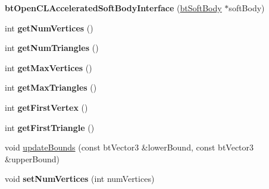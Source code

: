 \begin{DoxyCompactItemize}
\item 
\hypertarget{classbt_open_c_l_accelerated_soft_body_interface_a0a1876d09fadf797d65cb9917ca86e87}{{\bfseries bt\+Open\+C\+L\+Accelerated\+Soft\+Body\+Interface} (\hyperlink{classbt_soft_body}{bt\+Soft\+Body} $\ast$soft\+Body)}\label{classbt_open_c_l_accelerated_soft_body_interface_a0a1876d09fadf797d65cb9917ca86e87}

\item 
\hypertarget{classbt_open_c_l_accelerated_soft_body_interface_a969a40bb22b69af274843499bf48416c}{int {\bfseries get\+Num\+Vertices} ()}\label{classbt_open_c_l_accelerated_soft_body_interface_a969a40bb22b69af274843499bf48416c}

\item 
\hypertarget{classbt_open_c_l_accelerated_soft_body_interface_a577f0e851770e756515294ca475bcef3}{int {\bfseries get\+Num\+Triangles} ()}\label{classbt_open_c_l_accelerated_soft_body_interface_a577f0e851770e756515294ca475bcef3}

\item 
\hypertarget{classbt_open_c_l_accelerated_soft_body_interface_a4c3cf743e4af762e1e985da0aab05412}{int {\bfseries get\+Max\+Vertices} ()}\label{classbt_open_c_l_accelerated_soft_body_interface_a4c3cf743e4af762e1e985da0aab05412}

\item 
\hypertarget{classbt_open_c_l_accelerated_soft_body_interface_a500adc07a0d67e6574d30bce3e12e240}{int {\bfseries get\+Max\+Triangles} ()}\label{classbt_open_c_l_accelerated_soft_body_interface_a500adc07a0d67e6574d30bce3e12e240}

\item 
\hypertarget{classbt_open_c_l_accelerated_soft_body_interface_a40343ab4b8206db1f23881944326a831}{int {\bfseries get\+First\+Vertex} ()}\label{classbt_open_c_l_accelerated_soft_body_interface_a40343ab4b8206db1f23881944326a831}

\item 
\hypertarget{classbt_open_c_l_accelerated_soft_body_interface_aff3b22ed5bc522dcdb53f85bfda0c730}{int {\bfseries get\+First\+Triangle} ()}\label{classbt_open_c_l_accelerated_soft_body_interface_aff3b22ed5bc522dcdb53f85bfda0c730}

\item 
void \hyperlink{classbt_open_c_l_accelerated_soft_body_interface_a4ffffc49b4b4c0512de11a8884154fe9}{update\+Bounds} (const bt\+Vector3 \&lower\+Bound, const bt\+Vector3 \&upper\+Bound)
\item 
\hypertarget{classbt_open_c_l_accelerated_soft_body_interface_a1c2237dd7df117883a24eae0ee961e3c}{void {\bfseries set\+Num\+Vertices} (int num\+Vertices)}\label{classbt_open_c_l_accelerated_soft_body_interface_a1c2237dd7df117883a24eae0ee961e3c}


\end{DoxyCompactItemize}
